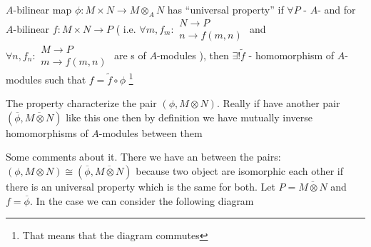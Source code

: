 \begin{definition}
  $A$-bilinear map $\phi: M \times N \to M \otimes_A N$ has
  ``universal property'' if
  $\forall P$ - $A$- and
  for $A$-bilinear $f: M \times N \to P$ (
  i.e.
  \(
  \forall m, f_m:
  \begin{array}{c}
    N \to P \\
    n \to f(m,n)
    \end{array}
  \)
  and
  \(
  \forall n, f_n:
  \begin{array}{c}
    M \to P \\
    m \to f(m,n)
    \end{array}
  \)
  are s of $A$-modules
  ), then
  $\exists! \tilde{f}$ - homomorphism of $A$-modules such that
  $f = \tilde{f} \circ \phi$
  \footnote{
    That means that the diagram commutes
  }

  \label{def:universalproperty}
\end{definition}

The property characterize the pair
$\left(\phi, M \otimes N\right)$.
Really if have another pair
$\left(\overline{\phi}, \overline{M \otimes N}\right)$
like this one then by definition we have mutually inverse
homomorphisms of $A$-modules between them

Some comments about it. There we have an 
between the pairs: 
$\left(\phi, M \otimes N\right) \cong \left(\overline{\phi},
\overline{M \otimes N}\right)$ because two object are isomorphic
each other if there is an universal property which is the same for
both. Let  $P = \overline{M \otimes N}$ and $f = \overline{\phi}$. In
the case we can consider the following diagram

